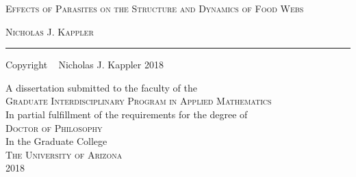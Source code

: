 \documentclass[dissertation.tex]{subfiles}
\begin{document}
\thispagestyle{empty}
\vspace*{.5in}

    \centering
    {\LARGE \textsc{Effects of Parasites on the Structure and Dynamics of Food
    Webs}}
        \vspace{.25in}
        
        \normalsize 
        {\textsc{Nicholas J. Kappler}}
        \vspace{1in}

        {\rule{1.75in}{1.25pt}}

        Copyright \textcopyright~ Nicholas J. Kappler 2018
        \vspace{1.05in}

        \parbox{3.25in}{
            \centering
        A dissertation submitted to the faculty of the \\ 
        \large\textsc{Graduate Interdisciplinary Program in Applied Mathematics}\\
        \normalsize In partial fulfillment of the requirements for the degree of \\
        \large \textsc{Doctor of Philosophy}\\
        In the Graduate College\\
        \large \textsc{The University of Arizona}\\[.5in]
    
    \Large{2018}}
     
\end{document}
